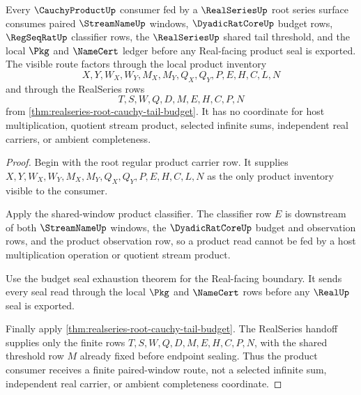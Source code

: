 \begin{theorem}
\label{thm:cauchy-product-root-series-handoff-exhaustion}
Every $\CauchyProductUp$ consumer fed by a $\RealSeriesUp$ root series surface consumes paired $\StreamNameUp$ windows, $\DyadicRatCoreUp$ budget rows, $\RegSeqRatUp$ classifier rows, the $\RealSeriesUp$ shared tail threshold, and the local $\Pkg$ and $\NameCert$ ledger before any Real-facing product seal is exported. The visible route factors through the local product inventory
$$
X,Y,W_X,W_Y,M_X,M_Y,Q_X,Q_Y,P,E,H,C,L,N
$$
and through the RealSeries rows
$$
T,S,W,Q,D,M,E,H,C,P,N
$$
from \autoref{thm:realseries-root-cauchy-tail-budget}. It has no coordinate for host multiplication, quotient stream product, selected infinite sums, independent real carriers, or ambient completeness.
\end{theorem}
\begin{proof}
Begin with the root regular product carrier row. It supplies $X,Y,W_X,W_Y,M_X,M_Y,Q_X,Q_Y,P,E,H,C,L,N$ as the only product inventory visible to the consumer.

Apply the shared-window product classifier. The classifier row $E$ is downstream of both $\StreamNameUp$ windows, the $\DyadicRatCoreUp$ budget and observation rows, and the product observation row, so a product read cannot be fed by a host multiplication operation or quotient stream product.

Use the budget seal exhaustion theorem for the Real-facing boundary. It sends every seal read through the local $\Pkg$ and $\NameCert$ rows before any $\RealUp$ seal is exported.

Finally apply \autoref{thm:realseries-root-cauchy-tail-budget}. The RealSeries handoff supplies only the finite rows $T,S,W,Q,D,M,E,H,C,P,N$, with the shared threshold row $M$ already fixed before endpoint sealing. Thus the product consumer receives a finite paired-window route, not a selected infinite sum, independent real carrier, or ambient completeness coordinate.
\end{proof}

